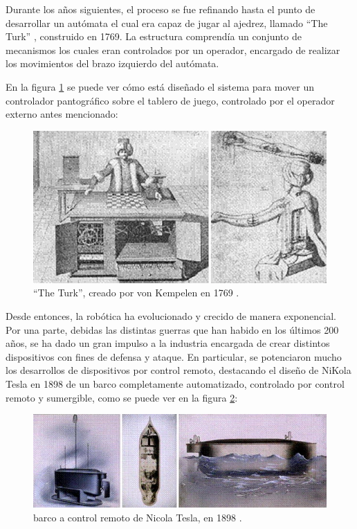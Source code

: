 Durante los años siguientes, el proceso se fue refinando hasta el punto de desarrollar un autómata
el cual era capaz de jugar al ajedrez, llamado ``The Turk'' \cite{standage_tom_turk_2002}, construido
en 1769. La estructura comprendía un conjunto de mecanismos los cuales eran controlados por un operador,
encargado de realizar los movimientos del brazo izquierdo del autómata.

En la figura \ref{fig:turk} se puede ver cómo está diseñado el sistema para mover un controlador 
pantográfico sobre el tablero de juego, controlado por el operador externo antes mencionado:

\begin{figure}[H]
    \centering
    \includegraphics[width=.75\linewidth]{pictures/chess_evolution.png}
    \caption{``The Turk'', creado por von Kempelen en 1769 \cite{standage_tom_turk_2002}.}
    \label{fig:turk}
\end{figure}

Desde entonces, la robótica ha evolucionado y crecido de manera exponencial. Por una parte, debidas
las distintas guerras que han habido en los últimos 200 años, se ha dado un gran impulso a la 
industria encargada de crear distintos dispositivos con fines de defensa y ataque. En particular,
se potenciaron mucho los desarrollos de dispositivos por control remoto, destacando el diseño de
NiKola Tesla en 1898 de un barco completamente automatizado, controlado por control remoto y sumergible,
como se puede ver en la figura \ref{fig:nicola_tesla_boat}:

\begin{figure}[H]
    \centering
    \includegraphics[width=.75\linewidth]{pictures/nicola_tesla_boat.png}
    \caption{barco a control remoto de Nicola Tesla, en 1898 \cite{belarmino_j_and_moran_me_and_firoozi_f_and_capello_s_and_kolios_e_and_perrotti_m_teslas_2005}.}
    \label{fig:nicola_tesla_boat}
\end{figure}

